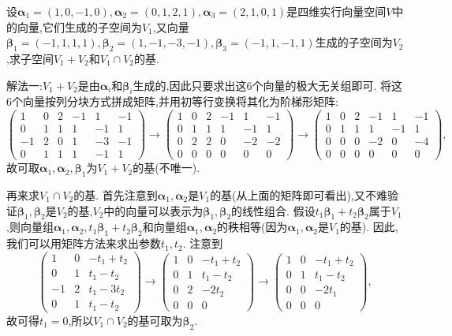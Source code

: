 \documentclass[../../main.tex]{subfiles}
\begin{document}
\begin{exercise}
设\(\boldsymbol{\alpha}_1=(1,0, - 1,0),\boldsymbol{\alpha}_2=(0,1,2,1),\boldsymbol{\alpha}_3=(2,1,0,1)\)是四维实行向量空间\(V\)中的向量,它们生成的子空间为\(V_1\),又向量\(\boldsymbol{\beta}_1=(-1,1,1,1),\boldsymbol{\beta}_2=(1,-1,-3,-1),\boldsymbol{\beta}_3=(-1,1,-1,1)\)生成的子空间为\(V_2\),求子空间\(V_1 + V_2\)和\(V_1\cap V_2\)的基.
\end{exercise}
\begin{solution}
{\color{blue}解法一:}\(V_1 + V_2\)是由\(\boldsymbol{\alpha}_i\)和\(\boldsymbol{\beta}_i\)生成的,因此只要求出这6个向量的极大无关组即可. 将这6个向量按列分块方式拼成矩阵,并用初等行变换将其化为阶梯形矩阵:
\[
\begin{pmatrix}
1&0&2&-1&1&-1\\
0&1&1&1&-1&1\\
-1&2&0&1&-3&-1\\
0&1&1&1&-1&1
\end{pmatrix}\to
\begin{pmatrix}
1&0&2&-1&1&-1\\
0&1&1&1&-1&1\\
0&2&2&0&-2&-2\\
0&0&0&0&0&0
\end{pmatrix}\to
\begin{pmatrix}
1&0&2&-1&1&-1\\
0&1&1&1&-1&1\\
0&0&0&-2&0&-4\\
0&0&0&0&0&0
\end{pmatrix},
\]
故可取\(\boldsymbol{\alpha}_1,\boldsymbol{\alpha}_2,\boldsymbol{\beta}_1\)为\(V_1 + V_2\)的基(不唯一).

再来求\(V_1\cap V_2\)的基. 首先注意到\(\boldsymbol{\alpha}_1,\boldsymbol{\alpha}_2\)是\(V_1\)的基(从上面的矩阵即可看出),又不难验证\(\boldsymbol{\beta}_1,\boldsymbol{\beta}_2\)是\(V_2\)的基,\(V_2\)中的向量可以表示为\(\boldsymbol{\beta}_1,\boldsymbol{\beta}_2\)的线性组合. 假设\(t_1\boldsymbol{\beta}_1 + t_2\boldsymbol{\beta}_2\)属于\(V_1\),则向量组\(\boldsymbol{\alpha}_1,\boldsymbol{\alpha}_2,t_1\boldsymbol{\beta}_1 + t_2\boldsymbol{\beta}_2\)和向量组\(\boldsymbol{\alpha}_1,\boldsymbol{\alpha}_2\)的秩相等(因为\(\boldsymbol{\alpha}_1,\boldsymbol{\alpha}_2\)是\(V_1\)的基). 因此,我们可以用矩阵方法来求出参数\(t_1,t_2\). 注意到
\[
\begin{pmatrix}
1&0&-t_1 + t_2\\
0&1&t_1 - t_2\\
-1&2&t_1 - 3t_2\\
0&1&t_1 - t_2
\end{pmatrix}\to
\begin{pmatrix}
1&0&-t_1 + t_2\\
0&1&t_1 - t_2\\
0&2&-2t_2\\
0&0&0
\end{pmatrix}\to
\begin{pmatrix}
1&0&-t_1 + t_2\\
0&1&t_1 - t_2\\
0&0&-2t_1\\
0&0&0
\end{pmatrix},
\]
故可得\(t_1 = 0\),所以\(V_1\cap V_2\)的基可取为\(\boldsymbol{\beta}_2\).


\end{solution}
\end{document}
